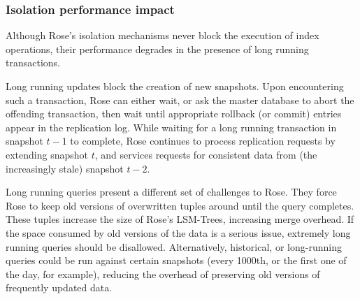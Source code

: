 \documentclass{vldb}
\newcommand{\rows}{Rose\xspace}
\newcommand{\rowss}{Rose's\xspace}
\begin{document}
\subsubsection{Isolation performance impact}

Although \rowss isolation mechanisms never block the execution of
index operations, their performance degrades in the presence of long
running transactions.

Long running updates block the creation of new snapshots.  Upon
encountering such a transaction, \rows can either wait, or ask the
master database to abort the offending transaction, then wait until
appropriate rollback (or commit) entries appear in the replication
log.  While waiting for a long running transaction in snapshot $t-1$
to complete, \rows continues to process replication requests by
extending snapshot $t$, and services requests for consistent data from
(the increasingly stale) snapshot $t-2$.



Long running queries present a different set of challenges to \rows.
They force \rows to keep old versions of overwritten tuples around
until the query completes.  These tuples increase the size of \rowss
LSM-Trees, increasing merge overhead.  If the space consumed by old
versions of the data is a serious issue, extremely long running
queries should be disallowed.  Alternatively, historical, or
long-running queries could be run against certain snapshots (every
1000th, or the first one of the day, for example), reducing the
overhead of preserving old versions of frequently updated data.
\end{document}
